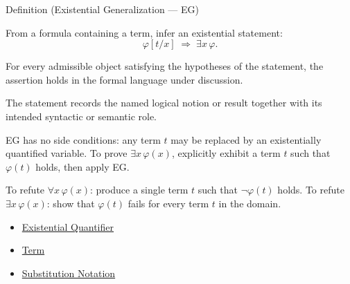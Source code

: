 \begin{definitionbox}{Definition (Existential Generalization --- EG)}
\begin{definition}\label{def:eg}
From a formula containing a term, infer an existential statement:
\[
\varphi[t/x] \;\Rightarrow\; \exists x\,\varphi.
\]
\end{definition}
\end{definitionbox}
\begin{remark*}
For every admissible object satisfying the hypotheses of the statement, the
assertion holds in the formal language under discussion.
\end{remark*}

\begin{remark*}[Interpretation]
The statement records the named logical notion or result together with its
intended syntactic or semantic role.
\end{remark*}


\begin{remark*}[Exposition]
EG has no side conditions: any term $t$ may be replaced by an existentially
quantified variable. To prove $\exists x\,\varphi(x)$, explicitly exhibit a
term $t$ such that $\varphi(t)$ holds, then apply EG.
\end{remark*}

\begin{remark*}[Exposition]
To refute $\forall x\,\varphi(x)$: produce a single term $t$ such that
$\neg\varphi(t)$ holds. To refute $\exists x\,\varphi(x)$: show that $\varphi(t)$
fails for every term $t$ in the domain.
\end{remark*}


\begin{dependencies}
\begin{itemize}
  \item \hyperref[def:existential-q]{Existential Quantifier}
  \item \hyperref[def:term]{Term}
  \item \hyperref[def:subst-notation]{Substitution Notation}
\end{itemize}
\end{dependencies}
